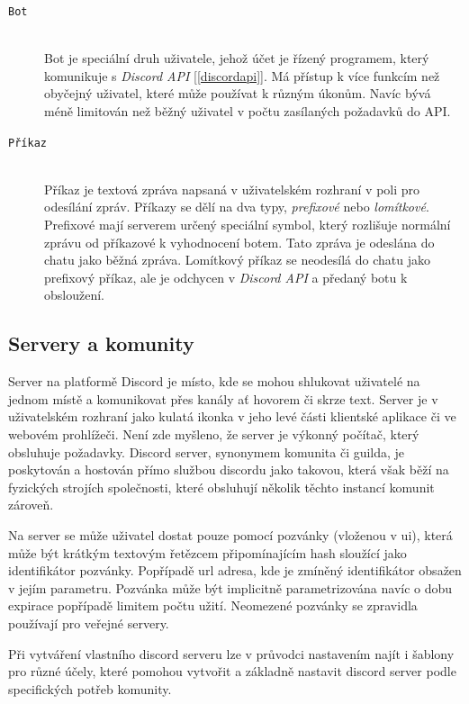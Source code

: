 \documentclass[
  program=inf,
biblatex=false,
sourcecodes=true,
joinlists=true,
  figures=true,
  tables=true,
  glossaries=true,
  index=false
]{kidiplom}
\begin{document}
\begin{description}
\item[\texttt{Bot}] \hfill \\
    Bot je speciální druh uživatele, jehož účet je řízený programem, který komunikuje
    s {\it Discord API} [\ref{discordapi}]. Má přístup k více funkcím než obyčejný uživatel, které může používat
    k různým úkonům. Navíc bývá méně limitován než běžný uživatel v počtu
    zasílaných požadavků do API.

\item[\texttt{Příkaz}] \hfill \\
    Příkaz je textová zpráva napsaná v uživatelském rozhraní v poli pro odesílání
    zpráv. Příkazy se dělí na dva typy, {\it prefixové} nebo {\it lomítkové}. Prefixové
    mají serverem určený speciální symbol, který rozlišuje normální zprávu od příkazové
    k vyhodnocení botem. Tato zpráva je odeslána do chatu jako běžná zpráva. Lomítkový příkaz 
    se neodesílá do chatu jako prefixový příkaz, ale je odchycen v {\it Discord API} a předaný
    botu k obsloužení.

\end{description}


\subsection{Servery a komunity}
Server na platformě Discord je místo, kde se mohou shlukovat uživatelé na jednom místě a komunikovat přes kanály ať hovorem či skrze text.
Server je v uživatelském rozhraní jako kulatá ikonka v jeho levé části klientské aplikace či ve webovém prohlížeči.
Není zde myšleno, že server je výkonný počítač, který obsluhuje požadavky. Discord server, synonymem komunita či guilda, je poskytován a hostován přímo službou discordu jako takovou,
která však běží na fyzických strojích společnosti, které obsluhují několik těchto instancí komunit zároveň.

Na server se může uživatel dostat pouze pomocí pozvánky (vloženou v \acrshort{ui}), která může být krátkým textovým řetězcem připomínajícím hash 
sloužící jako identifikátor pozvánky. Popřípadě \acrshort{url} adresa, kde je zmíněný identifikátor obsažen v jejím parametru. Pozvánka může být
implicitně parametrizována navíc o dobu expirace popřípadě limitem počtu užití. 
Neomezené pozvánky se zpravidla používají pro veřejné servery.

Při vytváření vlastního discord serveru lze v průvodci nastavením najít i šablony pro různé účely, 
které pomohou vytvořit a základně nastavit discord server podle specifických potřeb komunity.
\end{document}
